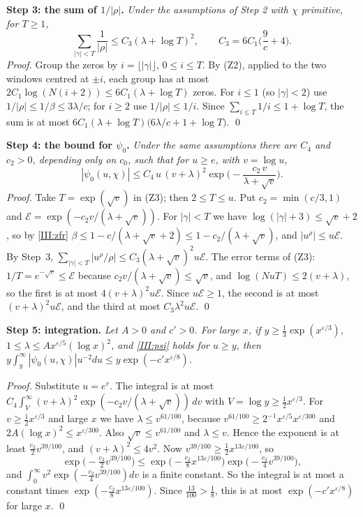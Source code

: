 \documentclass[11pt,letterpaper]{article}
\begin{document}
\textbf{Step 3: the sum of $1/|\rho|$.} \emph{Under the assumptions of Step 2 with $\chi$ primitive, for
$T\ge1$,}
\begin{equation}\label{D:137}
 \sum_{|\gamma|<T}\frac1{|\rho|}\le C_3(\lambda+\log T)^2,\qquad C_3=6C_1\Big(\frac9c+4\Big).
\end{equation}
\emph{Proof.} Group the zeros by $i=\lfloor|\gamma|\rfloor$, $0\le i\le T$. By (Z2), applied to the two windows centred at $\pm i$, each group has at most
$2C_1\log(N(i+2))\le6C_1(\lambda+\log T)$ zeros. For $i\le1$ (so $|\gamma|<2$) use $1/|\rho|\le1/\beta\le3\lambda/c$; for
$i\ge2$ use $1/|\rho|\le1/i$. Since $\sum_{i\le T}1/i\le1+\log T$, the sum is at most
$6C_1(\lambda+\log T)\big(6\lambda/c+1+\log T\big)$. \qed

\textbf{Step 4: the bound for $\psi_0$.} \emph{Under the same assumptions there are $C_4$ and $c_2>0$,
depending only on $c_0$, such that for $u\ge e$, with $v=\log u$,}
\begin{equation}\label{III:psi}
 |\psi_0(u,\chi)|\le C_4\,u\,(v+\lambda)^2\exp\Big(-\frac{c_2\,v}{\lambda+\sqrt v}\Big).
\end{equation}
\emph{Proof.} Take $T=\exp(\sqrt v)$ in (Z3); then $2\le T\le u$. Put $c_2=\min(c/3,1)$ and
$\mathcal E=\exp(-c_2v/(\lambda+\sqrt v))$. For $|\gamma|<T$ we have $\log(|\gamma|+3)\le\sqrt v+2$, so by
\eqref{III:zfr} $\beta\le1-c/(\lambda+\sqrt v+2)\le1-c_2/(\lambda+\sqrt v)$, and $|u^\rho|\le u\mathcal E$. By
Step~3, $\sum_{|\gamma|<T}|u^\rho/\rho|\le C_3(\lambda+\sqrt v)^2u\mathcal E$. The error terms of (Z3):
$1/T=e^{-\sqrt v}\le\mathcal E$ because $c_2v/(\lambda+\sqrt v)\le\sqrt v$, and
$\log(NuT)\le2(v+\lambda)$, so the first is at most $4(v+\lambda)^2u\mathcal E$. Since $u\mathcal E\ge1$, the
second is at most $(v+\lambda)^2u\mathcal E$, and the third at most $C_3\lambda^2u\mathcal E$. \qed

\textbf{Step 5: integration.} \emph{Let $A>0$ and $c'>0$. For large $x$, if
$y\ge\frac13\exp(x^{\varepsilon/3})$, $1\le\lambda\le Ax^{\varepsilon/5}(\log x)^2$, and \eqref{III:psi} holds
for $u\ge y$, then $y\int_y^\infty|\psi_0(u,\chi)|u^{-2}du\le y\exp(-c'x^{\varepsilon/8})$.}

\noindent\emph{Proof.} Substitute $u=e^v$. The integral is at most
$C_4\int_V^\infty(v+\lambda)^2\exp(-c_2v/(\lambda+\sqrt v))\,dv$ with $V=\log y\ge\frac12x^{\varepsilon/3}$. For
$v\ge\frac12x^{\varepsilon/3}$ and large $x$ we have $\lambda\le v^{61/100}$, because
$v^{61/100}\ge2^{-1}x^{\varepsilon/5}x^{\varepsilon/300}$ and $2A(\log x)^2\le x^{\varepsilon/300}$. Also
$\sqrt v\le v^{61/100}$ and $\lambda\le v$. Hence the exponent is at least $\frac{c_2}2v^{39/100}$, and
$(v+\lambda)^2\le4v^2$. Now $v^{39/100}\ge\frac12x^{13\varepsilon/100}$, so
\begin{equation}\label{D:139}
 \exp\big(-\tfrac{c_2}2v^{39/100}\big)\le\exp\big(-\tfrac{c_2}8x^{13\varepsilon/100}\big)\exp\big(-\tfrac{c_2}4v^{39/100}\big),
\end{equation}
and $\int_0^\infty v^2\exp(-\frac{c_2}4v^{39/100})dv$ is a finite constant. So the integral is at most a
constant times $\exp(-\frac{c_2}8x^{13\varepsilon/100})$. Since $\frac{13}{100}>\frac18$, this is at most
$\exp(-c'x^{\varepsilon/8})$ for large $x$. \qed
\end{document}
